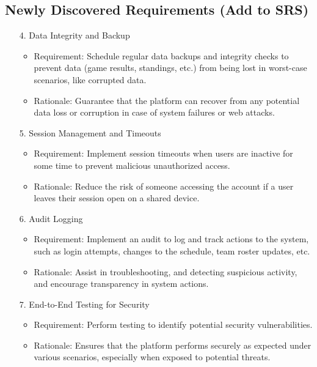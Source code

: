 \documentclass{article}
\begin{document}
\subsection{Newly Discovered Requirements (Add to SRS)}
\begin{enumerate}
    \item[4.] Data Integrity and Backup
        \begin{itemize}
            \item Requirement: Schedule regular data backups and integrity checks to prevent data (game results, standings, etc.)  from being lost in worst-case scenarios, like corrupted data.
            \item Rationale: Guarantee that the platform can recover from any potential data loss or corruption in case of system failures or web attacks.
        \end{itemize}
    \item[5.] Session Management and Timeouts
        \begin{itemize}
            \item Requirement: Implement session timeouts when users are inactive for some time to prevent malicious unauthorized access.
            \item Rationale: Reduce the risk of someone accessing the account if a user leaves their session open on a shared device.
        \end{itemize}
    \item[6.] Audit Logging
        \begin{itemize}
            \item Requirement: Implement an audit to log and track actions to the system, such as login attempts, changes to the schedule, team roster updates, etc.
            \item Rationale: Assist in troubleshooting, and detecting suspicious activity, and encourage transparency in system actions.
        \end{itemize}
    \item[7.] End-to-End Testing for Security
        \begin{itemize}
            \item Requirement: Perform testing to identify potential security vulnerabilities.
            \item Rationale: Ensures that the platform performs securely as expected under various scenarios, especially when exposed to potential threats.
        \end{itemize}
\end{enumerate}
\end{document}
